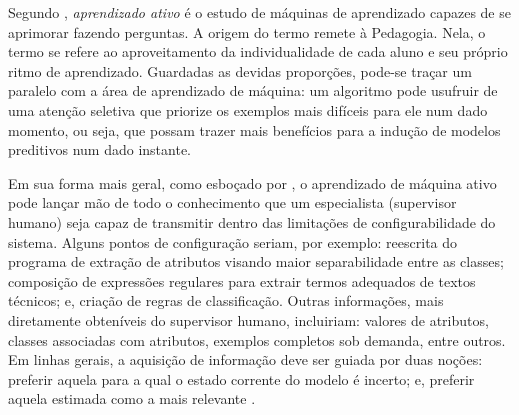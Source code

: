 Segundo , \textit{aprendizado ativo} é o estudo de máquinas de aprendizado capazes de se aprimorar fazendo perguntas.
A origem do termo remete à Pedagogia. Nela, o termo se refere ao aproveitamento da
individualidade de cada aluno e seu próprio ritmo de aprendizado.
Guardadas as devidas proporções, pode-se traçar um paralelo com a área de aprendizado de máquina: um algoritmo pode usufruir de uma atenção seletiva que priorize os exemplos mais difíceis para ele num dado momento, ou seja, que possam trazer mais benefícios para a indução de modelos preditivos num dado instante.

Em sua forma mais geral, como esboçado por , o aprendizado de máquina ativo pode lançar mão de todo o conhecimento que um especialista (supervisor humano) seja capaz de transmitir dentro das limitações de configurabilidade do sistema.
Alguns pontos de configuração seriam, por exemplo:
reescrita do programa
de extração de atributos visando maior separabilidade entre as classes; composição de expressões regulares para extrair termos adequados de textos técnicos;
e, criação de regras de classificação.
Outras informações, mais diretamente obteníveis do supervisor humano, 
incluiriam: valores de atributos, classes associadas com atributos, 
exemplos completos sob demanda, entre outros.
Em linhas gerais, a aquisição de informação deve ser guiada por duas noções:
preferir aquela para a qual o estado corrente do modelo é incerto; e,
preferir aquela estimada como a mais relevante
\cite{krishnapuram2011cost}.

